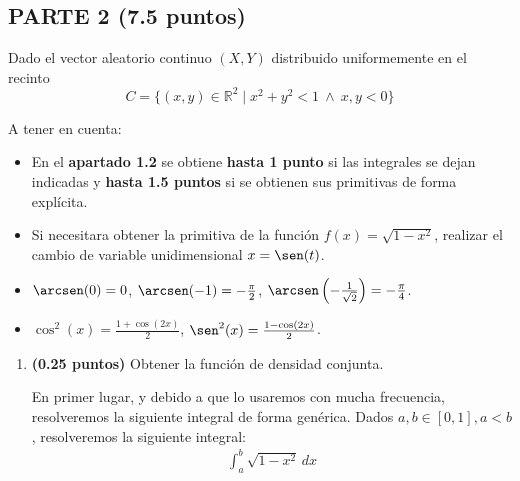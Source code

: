 \documentclass[12pt]{article}
\begin{document}
    \subsection*{PARTE 2 (7.5 puntos)}
    \setcounter{ejercicio}{0}
    \begin{ejercicio}[5 puntos]
        Dado el vector aleatorio continuo $(X,Y)$ distribuido uniformemente en el recinto
        \begin{equation*}
            C = \{(x,y)\in \mathbb{R}^2 \mid x^2+y^2 < 1 \ \land\ x,y < 0\}
        \end{equation*}

    \begin{observacion}
        A tener en cuenta:
        \begin{itemize}
            \item En el \textbf{apartado 1.2} se obtiene \textbf{hasta 1 punto} si las integrales se dejan indicadas y \textbf{hasta 1.5 puntos} si se obtienen sus primitivas de forma explícita.
            \item Si necesitara obtener la primitiva de la función $f(x) = \sqrt{1-x^2}$, realizar el cambio de variable unidimensional $x=\sen(t)$.
            \item $\arcsen(0)=0$, $\arcsen(-1)=-\frac{\pi}{2}$, $\arcsen\left(-\frac{1}{\sqrt{2}}\right) = -\frac{\pi}{4}$.
            \item $\cos^2(x) = \frac{1+\cos(2x)}{2}$, $\sen^2(x) = \frac{1-\cos(2x)}{2}$.
        \end{itemize}
    \end{observacion}
\begin{enumerate}
    \item \textbf{(0.25 puntos)} Obtener la función de densidad conjunta.
    
    En primer lugar, y debido a que lo usaremos con mucha frecuencia, resolveremos la siguiente integral de forma genérica. Dados $a,b\in \left[0,1\right], a<b$, resolveremos la siguiente integral:
    \begin{align*}
        \int_{a}^{b} \sqrt{1-x^2} \, dx
    \end{align*}


\end{enumerate}
\end{ejercicio}
\end{document}

